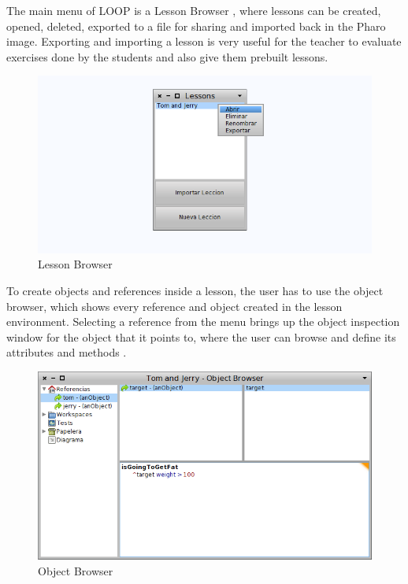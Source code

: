 \documentclass{sigplanconf}
\begin{document}
The main menu of LOOP is a Lesson Browser , where lessons can be created, opened, deleted, exported to a file for sharing and imported back in the Pharo image. Exporting and importing a lesson is very useful for the teacher to evaluate exercises done by the students and also give them prebuilt lessons.
\begin{figure}[h]
 \centering
 \includegraphics[scale=.35]{./images/lessonBrowser.png}
 \caption{Lesson Browser}
 \label{fig:lessonBrowser}
\end{figure}

To create objects and references inside a lesson, the user has to use the object browser, which shows every reference and object created in the lesson environment. Selecting a reference from the menu brings up the object inspection window for the object that it points to, where the user can browse and define its attributes and methods . 
\begin{figure}[h]
 \centering
 \includegraphics[scale=.35]{./images/objectBrowser.png}
 \caption{Object Browser}
 \label{fig:objectBrowser}
\end{figure}
\end{document}
